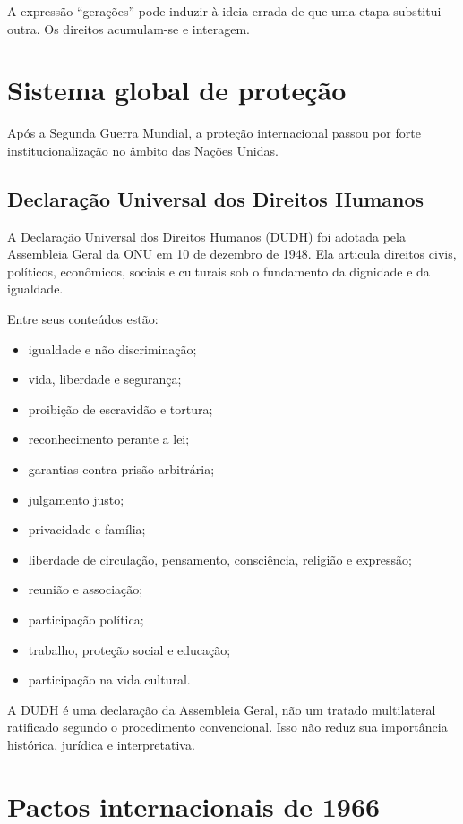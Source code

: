 A expressão ``gerações'' pode induzir à ideia errada de que uma etapa substitui outra. Os direitos acumulam-se e interagem.

\section{Sistema global de proteção}

Após a Segunda Guerra Mundial, a proteção internacional passou por forte institucionalização no âmbito das Nações Unidas.

\subsection{Declaração Universal dos Direitos Humanos}

A Declaração Universal dos Direitos Humanos (DUDH) foi adotada pela Assembleia Geral da ONU em 10 de dezembro de 1948. Ela articula direitos civis, políticos, econômicos, sociais e culturais sob o fundamento da dignidade e da igualdade.

Entre seus conteúdos estão:
\begin{itemize}
\item igualdade e não discriminação;
\item vida, liberdade e segurança;
\item proibição de escravidão e tortura;
\item reconhecimento perante a lei;
\item garantias contra prisão arbitrária;
\item julgamento justo;
\item privacidade e família;
\item liberdade de circulação, pensamento, consciência, religião e expressão;
\item reunião e associação;
\item participação política;
\item trabalho, proteção social e educação;
\item participação na vida cultural.
\end{itemize}

A DUDH é uma declaração da Assembleia Geral, não um tratado multilateral ratificado segundo o procedimento convencional. Isso não reduz sua importância histórica, jurídica e interpretativa.

\section{Pactos internacionais de 1966}

